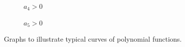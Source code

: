 \begin{figure}[!htb]
\begin{widepage}
\begin{subfigure}{\figurewidth}
\begin{tikzpicture}
			 \end{tikzpicture}
			 \caption{$a_4>0$}
			 \label{poly:fig:typical4}
		 \end{subfigure}
		 \hfill
		 \begin{subfigure}{\figurewidth}
			 \caption{$a_5>0$}
			 \label{poly:fig:typical5}
		 \end{subfigure}
		 \end{widepage}
		 \caption{Graphs to illustrate typical curves of polynomial functions.}
		 \label{poly:fig:typical}
	 \end{figure}

